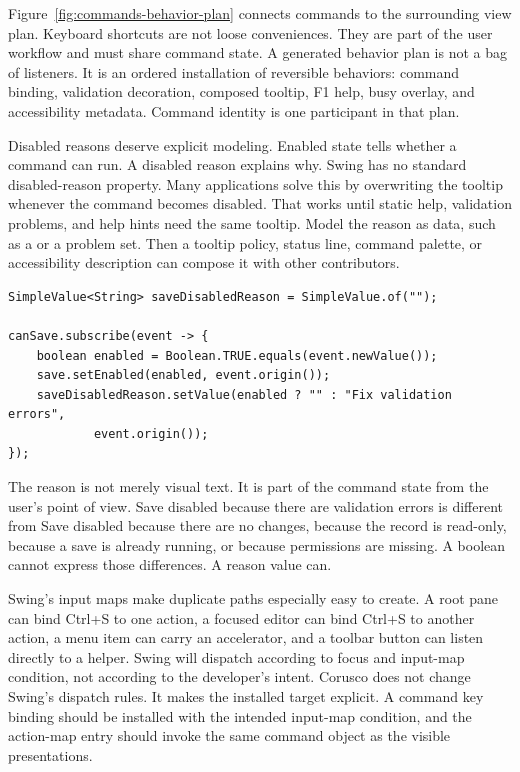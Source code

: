 Figure~\ref{fig:commands-behavior-plan} connects commands to the surrounding
view plan. Keyboard shortcuts are not loose conveniences. They are part of the
user workflow and must share command state. A generated behavior plan is not a
bag of listeners. It is an ordered installation of reversible behaviors:
command binding, validation decoration, composed tooltip, F1 help, busy
overlay, and accessibility metadata. Command identity is one participant in
that plan.

Disabled reasons deserve explicit modeling. Enabled state tells whether a
command can run. A disabled reason explains why. Swing  has no
standard disabled-reason property. Many applications solve this by overwriting
the tooltip whenever the command becomes disabled. That works until static
help, validation problems, and help hints need the same tooltip. Model the
reason as data, such as a  or a problem set. Then a
tooltip policy, status line, command palette, or accessibility description can
compose it with other contributors.

\begin{lstlisting}[caption={Command enablement with a reason value.}]
SimpleValue<String> saveDisabledReason = SimpleValue.of("");

canSave.subscribe(event -> {
    boolean enabled = Boolean.TRUE.equals(event.newValue());
    save.setEnabled(enabled, event.origin());
    saveDisabledReason.setValue(enabled ? "" : "Fix validation errors",
            event.origin());
});
\end{lstlisting}

The reason is not merely visual text. It is part of the command state from the
user's point of view. Save disabled because there are validation errors is
different from Save disabled because there are no changes, because the record
is read-only, because a save is already running, or because permissions are
missing. A boolean cannot express those differences. A reason value can.

Swing's input maps make duplicate paths especially easy to create. A root pane
can bind Ctrl+S to one action, a focused editor can bind Ctrl+S to another
action, a menu item can carry an accelerator, and a toolbar button can listen
directly to a helper. Swing will dispatch according to focus and input-map
condition, not according to the developer's intent. Corusco does not change
Swing's dispatch rules. It makes the installed target explicit. A command key
binding should be installed with the intended input-map condition, and the
action-map entry should invoke the same command object as the visible
presentations.

